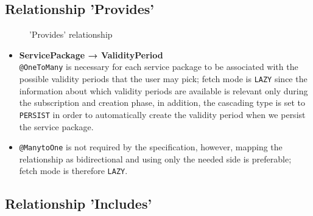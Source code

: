 \subsection*{Relationship 'Provides'}

\begin{minipage}[h]{0.5\textwidth}
    \begin{figure}[H]
        
        \caption{'Provides' relationship}
        \label{fig:orm_sp_vp}
    \end{figure}
\end{minipage}
\hfill
\begin{minipage}[h]{0.48\textwidth}
    \begin{itemize}
        \item \textbf{ServicePackage → ValidityPeriod} \\ \texttt{@OneToMany} is necessary for each service package to be associated with the possible validity periods that the user may pick; fetch mode is \texttt{LAZY} since the information about which validity periods are available is relevant only during the subscription and creation phase, in addition, the cascading type is set to \texttt{PERSIST} in order to automatically create the validity period when we persist the service package.
        \item \texttt{@ManytoOne} is not required by the specification, however, mapping the relationship as bidirectional and using only the needed side is preferable; fetch mode is therefore \texttt{LAZY}.
    \end{itemize}
\end{minipage}

\subsection*{Relationship 'Includes'}

